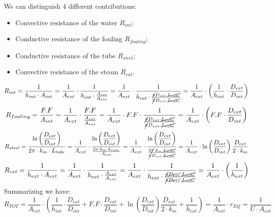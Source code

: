 \documentclass[a4paper,12pt]{article}
\begin{document}
We can distinguish 4 different contributions:
\begin{itemize}
\item Convective resistance of the water $R_{int}$;
\item Conductive resistance of the fouling $R_{fouling}$;
\item Conductive resistance of the tube $R_{steel}$;
\item Convective resistance of the steam $R_{ext}$.
\end{itemize}
\begin{equation}
R_{int} = \frac{1}{h_{int} \cdot A_{int}}
 = \frac{1}{A_{ext}} \cdot \frac{1}{h_{int} \cdot \frac{A_{int}}{A_{ext}}}
 = \frac{1}{A_{ext}} \cdot \frac{1}{h_{int} \cdot 
 \frac{\cancel{\pi} D_{int} \cdot \cancel{L_{tube}}}{ \cancel{\pi} D_{ext} \cdot \cancel{L_{tube}}}}
 = \frac{1}{A_{ext}} \cdot \left( \frac{1}{h_{int}} \cdot \frac{D_{ext}}{D_{int}} \right)
\end{equation}
\begin{equation}
R_{fouling} = \frac{F.F}{A_{int}}
 = \frac{1}{A_{ext}} \cdot \frac{F.F}{\frac{A_{int}}{A_{ext}}}
 = \frac{1}{A_{ext}} \cdot F.F \cdot \frac{1}{\frac{\cancel{\pi} D_{int} \cdot \cancel{L_{tube}}}{ \cancel{\pi} D_{ext} \cdot \cancel{L_{tube}}}}
 = \frac{1}{A_{ext}} \cdot \left( F.F \cdot \frac{D_{ext}}{D_{int}} \right)
\end{equation}
\begin{equation}
R_{steel} = \frac{\ln \left( 
\dfrac{D_{ext}}{D_{int}}
\right)}{2\pi \cdot k_m \cdot L_{tube}}
 = \frac{1}{A_{ext}} \cdot \frac{\ln \left( 
\dfrac{D_{ext}}{D_{int}}
\right)}{\frac{2\pi \cdot k_m \cdot L_{tube}}{A_{ext}}}
= \frac{1}{A_{ext}} \cdot \frac{\ln \left( 
\dfrac{D_{ext}}{D_{int}}
\right)}{\frac{2\cancel{\pi} \cdot k_m \cdot \cancel{L_{tube}}}{\cancel{\pi} D_{ext} \cdot \cancel{L_{tube}}}}
= \frac{1}{A_{ext}} \cdot \ln \left(\dfrac{D_{ext}}{D_{int}} \right)\frac{D_{ext}}{2 \cdot k_m}
\end{equation}
\begin{equation}
R_{ext} = \frac{1}{h_{ext} \cdot A_{ext}}
 = \frac{1}{A_{ext}} \cdot \frac{1}{h_{ext} \cdot \frac{A_{ext}}{A_{ext}}}
 = \frac{1}{A_{ext}} \cdot \frac{1}{h_{ext} \cdot 
 \frac{\cancel{\pi} \cancel{D_{ext}} \cdot \cancel{L_{tube}}}{ \cancel{\pi}  \cancel{D_{ext}} \cdot \cancel{L_{tube}}}}
 = \frac{1}{A_{ext}} \cdot \left( \frac{1}{h_{ext}} \right)
\end{equation}
Summarizing we have:
\begin{equation}
R_{TOT} = \frac{1}{A_{ext}} \cdot \left(
\frac{1}{h_{int}} \cdot \frac{D_{ext}}{D_{int}}
+ F.F \cdot \frac{D_{ext}}{D_{int}}
+ \ln \left(\dfrac{D_{ext}}{D_{int}} \right)\frac{D_{ext}}{2 \cdot k_m}
+ \frac{1}{h_{ext}}
\right)
= \frac{1}{A_{ext}} \cdot r_{EQ} = \frac{1}{U \cdot A_{ext}}
\end{equation}
\end{document}
